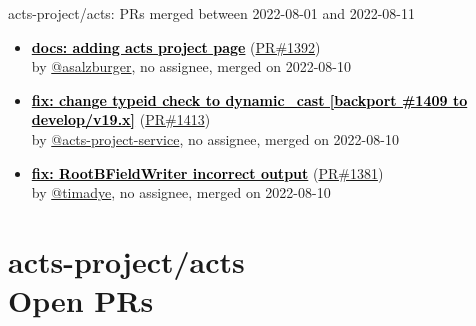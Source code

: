 \begin{frame}[allowframebreaks]{ acts-project/acts: PRs merged 
between 2022-08-01 and 2022-08-11
}
\begin{itemize}
    \item
    \prmerged\textbf{\href{https://github.com/acts-project/acts/pull/1392}{\textcolor{black}{docs: adding acts project page}}}
    (\href{https://github.com/acts-project/acts/pull/1392}{PR\#1392}) \\
    by \href{https://github.com/asalzburger}{@asalzburger}, {}no assignee, merged on 2022-08-10

    \item
    \prmerged\textbf{\href{https://github.com/acts-project/acts/pull/1413}{\textcolor{black}{fix: change typeid check to dynamic\_cast [backport \#1409 to develop/v19.x]}}}
    (\href{https://github.com/acts-project/acts/pull/1413}{PR\#1413}) \\
    by \href{https://github.com/acts-project-service}{@acts-project-service}, {}no assignee, merged on 2022-08-10

    \item
    \prmerged\textbf{\href{https://github.com/acts-project/acts/pull/1381}{\textcolor{black}{fix: RootBFieldWriter incorrect output}}}
    (\href{https://github.com/acts-project/acts/pull/1381}{PR\#1381}) \\
    by \href{https://github.com/timadye}{@timadye}, {}no assignee, merged on 2022-08-10

  \end{itemize}

\end{frame}



\section{ acts-project/acts \\ Open PRs}

